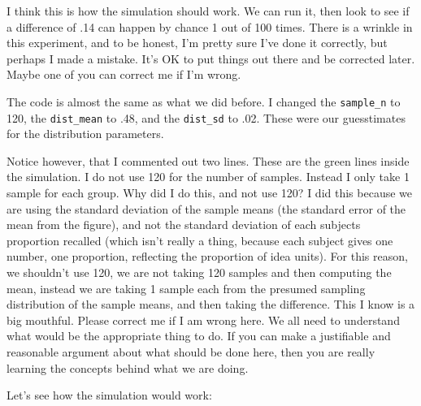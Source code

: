 \documentclass[]{book}
\theoremstyle{definition}
\theoremstyle{definition}
\theoremstyle{definition}
\theoremstyle{remark}
\begin{document}
I think this is how the simulation should work. We can run it, then look
to see if a difference of .14 can happen by chance 1 out of 100 times.
There is a wrinkle in this experiment, and to be honest, I'm pretty sure
I've done it correctly, but perhaps I made a mistake. It's OK to put
things out there and be corrected later. Maybe one of you can correct me
if I'm wrong.

The code is almost the same as what we did before. I changed the
\texttt{sample\_n} to 120, the \texttt{dist\_mean} to .48, and the
\texttt{dist\_sd} to .02. These were our guesstimates for the
distribution parameters.

Notice however, that I commented out two lines. These are the green
lines inside the simulation. I do not use 120 for the number of samples.
Instead I only take 1 sample for each group. Why did I do this, and not
use 120? I did this because we are using the standard deviation of the
sample means (the standard error of the mean from the figure), and not
the standard deviation of each subjects proportion recalled (which isn't
really a thing, because each subject gives one number, one proportion,
reflecting the proportion of idea units). For this reason, we shouldn't
use 120, we are not taking 120 samples and then computing the mean,
instead we are taking 1 sample each from the presumed sampling
distribution of the sample means, and then taking the difference. This I
know is a big mouthful. Please correct me if I am wrong here. We all
need to understand what would be the appropriate thing to do. If you can
make a justifiable and reasonable argument about what should be done
here, then you are really learning the concepts behind what we are
doing.

Let's see how the simulation would work:
\end{document}
